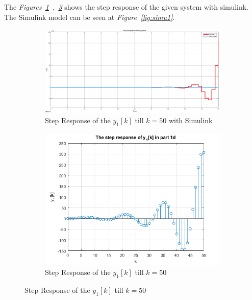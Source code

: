 \documentclass[a4paper,12pt]{article}
\begin{document}
\begin{enumerate}
\begin{enumerate}
 		The \textit{Figures~\ref{fig:s1}\ ,\ \ref{fig:s2}} shows the step response of the given system  with simulink. The Simulink model can be seen at \textit{Figure~\ref{fig:simu1}}.
 		
		 \begin{figure}[H]
 			\setlength{\unitlength}{\textwidth} 
 			\centering
 			\begin{subfigure}{.5\textwidth}
   				\centering
   				\includegraphics[width=0.48\unitlength]{images/1c}
   				\caption{\label{fig:s1} Step Response of the $y_1[k]$ till $k=50$ with Simulink}
 			\end{subfigure}%
 			\begin{subfigure}{.5\textwidth}
   				\centering
 				\includegraphics[width=0.48\unitlength]{images/1ca}
   				\caption{\label{fig:s2} Step Response of the $y_1[k]$ till $k=50$ }
 			\end{subfigure}
		 \end{figure}
		 

\end{enumerate}
\end{enumerate}
\end{document}
